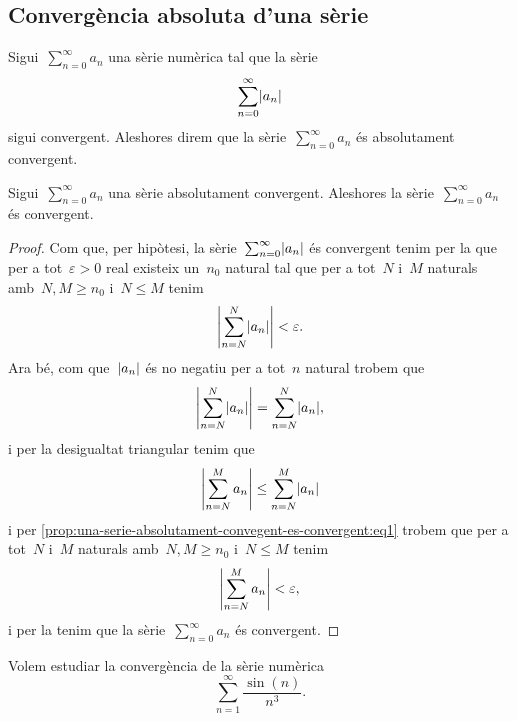 \documentclass[../analisi-matematica.tex]{subfiles}
\begin{document}
    \subsection{Convergència absoluta d'una sèrie}
    \begin{definition}
        \label{def:convergencia-absoluta-duna-serie}
        Sigui~\(\sum_{n=0}^{\infty}a_{n}\) una sèrie numèrica tal que la sèrie
        \[
            \sum_{n=0}^{\infty}\abs{a_{n}}
        \]
        sigui convergent.
        Aleshores direm que la sèrie~\(\sum_{n=0}^{\infty}a_{n}\) és absolutament convergent.
    \end{definition}
    \begin{proposition}
        \label{prop:una-serie-absolutament-convergent-es-convergent}
        Sigui~\(\sum_{n=0}^{\infty}a_{n}\) una sèrie absolutament convergent.
        Aleshores la sèrie~\(\sum_{n=0}^{\infty}a_{n}\) és convergent.
    \end{proposition}
    \begin{proof}
        Com que, per hipòtesi, la sèrie~\(\sum_{n=0}^{\infty}\abs{a_{n}}\) és convergent tenim per la  que per a tot~\(\varepsilon>0\) real existeix un~\(n_{0}\) natural tal que per a tot~\(N\) i~\(M\) naturals amb~\(N,M\geq n_{0}\) i~\(N\leq M\) tenim
        \begin{equation}
            \label{prop:una-serie-absolutament-convegent-es-convergent:eq1}
            \abs{\sum_{n=N}^{N}\abs{a_{n}}}<\varepsilon.
        \end{equation}
        Ara bé, com que~\(\abs{a_{n}}\) és no negatiu per a tot~\(n\) natural trobem que
        \[
            \abs{\sum_{n=N}^{N}\abs{a_{n}}}=\sum_{n=N}^{N}\abs{a_{n}},
        \]
        i per la desigualtat triangular %
        tenim que
        \[
            \abs{\sum_{n=N}^{M}a_{n}}\leq\sum_{n=N}^{M}\abs{a_{n}}
        \]
        i per \eqref{prop:una-serie-absolutament-convegent-es-convergent:eq1} trobem que per a tot~\(N\) i~\(M\) naturals amb~\(N,M\geq n_{0}\) i~\(N\leq M\) tenim
        \[
            \abs{\sum_{n=N}^{M}a_{n}}<\varepsilon,
        \]
        i per la  tenim que la sèrie~\(\sum_{n=0}^{\infty}a_{n}\) és convergent.
    \end{proof}
    \begin{example}
        \label{ex:serie-absolutament-convergent}
        Volem estudiar la convergència de la sèrie numèrica
        \begin{equation}
            \label{ex:serie-absolutament-convergent:eq1}
            \sum_{n=1}^{\infty}\frac{\sin(n)}{n^{3}}.
        \end{equation}
    \end{example}
\end{document}
